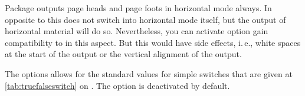 \begin{Declaration}
\end{Declaration}
Package  outputs page heads and page foots in horizontal
mode always. In opposite to this  does not switch
into horizontal mode itself, but the output of horizontal material will do
so. Nevertheless, you can activate option  gain compatibility to
 in this
aspect. But this would have side effects, i.\,e., white
spaces at the start of the output or the vertical alignment of the output.

The options allows for the standard values for simple switches that are given
at \autoref{tab:truefalseswitch} on . The
option is deactivated by default.%
\EndIndexGroup
%
\EndIndexGroup

